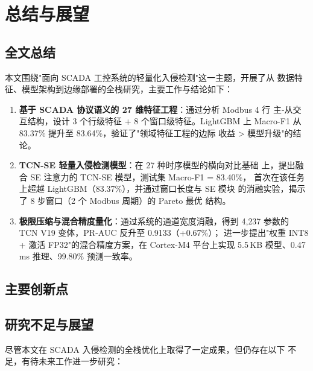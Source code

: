 
\chapter{总结与展望}
\label{chap:conclusion}

\section{全文总结}
\label{sec:conclusion_summary}

\par 本文围绕"面向 SCADA 工控系统的轻量化入侵检测"这一主题，开展了从
数据特征、模型架构到边缘部署的全栈研究，主要工作与结论如下：

\begin{enumerate}
  \item \textbf{基于 SCADA 协议语义的 27 维特征工程}：通过分析 Modbus 4 行
        主-从交互结构，设计 3 个行级特征 + 8 个窗口级特征。LightGBM 上
        Macro-F1 从 83.37\% 提升至 83.64\%，验证了"领域特征工程的边际
        收益 > 模型升级"的结论。
  \item \textbf{TCN-SE 轻量入侵检测模型}：在 27 种时序模型的横向对比基础
        上，提出融合 SE 注意力的 TCN-SE 模型，测试集 Macro-F1 = 83.40\%，
        首次在该任务上超越 LightGBM（83.37\%），并通过窗口长度与 SE 模块
        的消融实验，揭示了 8 步窗口（2 个 Modbus 周期）的 Pareto 最优
        结构。
  \item \textbf{极限压缩与混合精度量化}：通过系统的通道宽度消融，得到
        4{,}237 参数的 TCN V19 变体，PR-AUC 反升至 0.9133（+0.67\%）；
        进一步提出"权重 INT8 + 激活 FP32"的混合精度方案，在 Cortex-M4
        平台上实现 5.5\,KB 模型、0.47\,ms 推理、99.80\% 预测一致率。
\end{enumerate}

\section{主要创新点}
\label{sec:conclusion_innov}


\section{研究不足与展望}
\label{sec:conclusion_future}

\par 尽管本文在 SCADA 入侵检测的全栈优化上取得了一定成果，但仍存在以下
不足，有待未来工作进一步研究：

